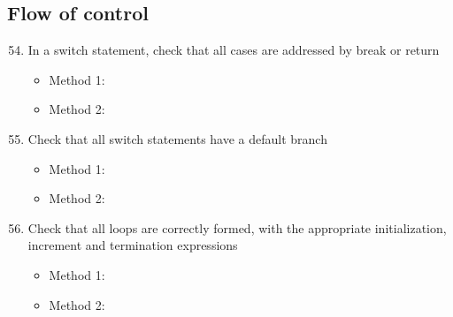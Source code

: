 \subsection{Flow of control}
\begin{enumerate}
\setcounter{enumi}{53}
	\item In a switch statement, check that all cases are addressed by break or return
	\begin{itemize}
		\item Method 1: \cmark
		\item Method 2: \cmark
	\end{itemize}
	\item Check that all switch statements have a default branch
	\begin{itemize}
		\item Method 1: \cmark
		\item Method 2: \cmark
	\end{itemize}
	\item Check that all loops are correctly formed, with the appropriate initialization, increment and termination expressions
	\begin{itemize}
		\item Method 1: \cmark
		\item Method 2: \cmark
	\end{itemize}
\end{enumerate}